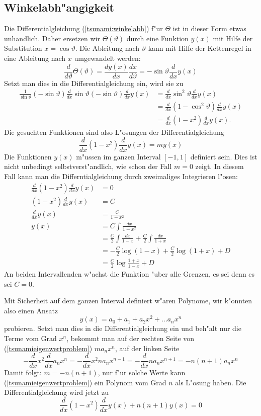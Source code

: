 \subsection{Winkelabh"angigkeit}
Die Differentialgleichung (\ref{tsunami:winkelabh}) f"ur $\Theta$
ist in dieser Form etwas unhandlich.
Daher ersetzen wir $\Theta(\vartheta)$ durch eine
Funktion $y(x)$ mit Hilfe der Substitution $x=\cos\vartheta$.
Die Ableitung nach $\vartheta$ kann mit Hilfe der Kettenregel
in eine Ableitung nach $x$ umgewandelt werden:
\[
\frac{d}{d\vartheta}\Theta(\vartheta)
=\frac{dy(x)}{dx}\frac{dx}{d\vartheta}
=-\sin\vartheta \frac{d}{dx} y(x)
\]
Setzt man dies in die Differentialgleichung ein, wird sie zu
\begin{align*}
\frac1{\sin\vartheta}
(-\sin{\vartheta})\frac{d}{dx}\sin\vartheta (-\sin\vartheta)
\frac{d}{dx}y(x)
&=
\frac{d}{dx}\sin^2\vartheta\frac{d}{dx}y(x)\\
&=
\frac{d}{dx}(1-\cos^2\vartheta)\frac{d}{dx}y(x)\\
&=
\frac{d}{dx}(1-x^2)\frac{d}{dx}y(x).
\end{align*}
Die gesuchten Funktionen sind also L"osungen der Differentialgleichung
\begin{equation}
\frac{d}{dx}(1-x^2)\frac{d}{dx}y(x)
=
my(x)
\label{tsunamieigenwertproblem}
\end{equation}
Die Funktionen $y(x)$ m"ussen im ganzen Interval $[-1,1]$ definiert
sein. Dies ist nicht unbedingt selbstverst"andlich, wie schon der Fall
$m=0$ zeigt. In diesem Fall kann man die Differntialgleichung
durch zweimaliges Integrieren l"osen:
\begin{align*}
\frac{d}{dx}(1-x^2)\frac{d}{dx}y(x)&=0\\
(1-x^2)\frac{d}{dx}y(x)&=C\\
\frac{d}{dx}y(x)&=\frac{C}{1-x^2}\\
y(x)&=C\int\frac{dx}{1-x^2}\\
&=\frac{C}2\int\frac{dx}{1-x}+\frac{C}2\int\frac{dx}{1+x}\\
&=-\frac{C}2\log(1-x)+\frac{C}2\log(1+x) +D\\
&=\frac{C}2\log\frac{1+x}{1-x} + D
\end{align*}
An beiden Intervallenden w"achst die Funktion "uber alle Grenzen,
es sei denn es sei $C=0$.

Mit Sicherheit auf dem ganzen Interval definiert w"aren Polynome,
wir k"onnten also einen Ansatz
$$
y(x)=a_0+a_1+a_2x^2+\dots a_nx^n
$$
probieren. Setzt man dies in die Differentialgleichung ein und
beh"alt nur die Terme vom Grad $x^n$, bekommt man auf der rechten
Seite von (\ref{tsunamieigenwertproblem}) $ma_nx^n$, auf
der linken Seite
$$
-\frac{d}{dx}x^2\frac{d}{dx}a_nx^n
=
-\frac{d}{dx}x^2na_nx^{n-1}
=
-\frac{d}{dx}na_nx^{n+1}
=
-n(n+1)a_nx^n
$$
Damit folgt: $m=-n(n+1)$, nur f"ur solche Werte kann
(\ref{tsunamieigenwertproblem}) ein Polynom vom Grad $n$ als L"osung
haben. Die Differentialgleichung wird jetzt zu
\begin{equation}
\frac{d}{dx}(1-x^2)\frac{d}{dx}y(x)+n(n+1)y(x)=0
\label{legendredgl}
\end{equation}

